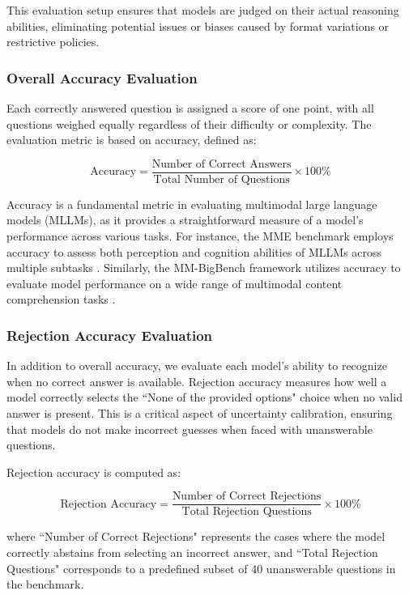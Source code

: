 This evaluation setup ensures that models are judged on their actual reasoning abilities, eliminating potential issues or biases caused by format variations or restrictive policies.

\subsubsection{Overall Accuracy Evaluation}

Each correctly answered question is assigned a score of one point, with all questions weighed equally regardless of their difficulty or complexity. The evaluation metric is based on accuracy, defined as:

\begin{equation}
\text{Accuracy} = \frac{\text{Number of Correct Answers}}{\text{Total Number of Questions}} \times 100\%
\end{equation}

Accuracy is a fundamental metric in evaluating multimodal large language models (MLLMs), as it provides a straightforward measure of a model's performance across various tasks. For instance, the MME benchmark employs accuracy to assess both perception and cognition abilities of MLLMs across multiple subtasks \cite{MME2023}. Similarly, the MM-BigBench framework utilizes accuracy to evaluate model performance on a wide range of multimodal content comprehension tasks \cite{MMBigBench2023}.

\subsubsection{Rejection Accuracy Evaluation}

In addition to overall accuracy, we evaluate each model’s ability to recognize when no correct answer is available. Rejection accuracy measures how well a model correctly selects the ``None of the provided options" choice when no valid answer is present. This is a critical aspect of uncertainty calibration, ensuring that models do not make incorrect guesses when faced with unanswerable questions.

Rejection accuracy is computed as:

\begin{equation}
\text{Rejection Accuracy} = \frac{\text{Number of Correct Rejections}}{\text{Total Rejection Questions}} \times 100\%
\end{equation}

where ``Number of Correct Rejections" represents the cases where the model correctly abstains from selecting an incorrect answer, and ``Total Rejection Questions" corresponds to a predefined subset of 40 unanswerable questions in the benchmark.

